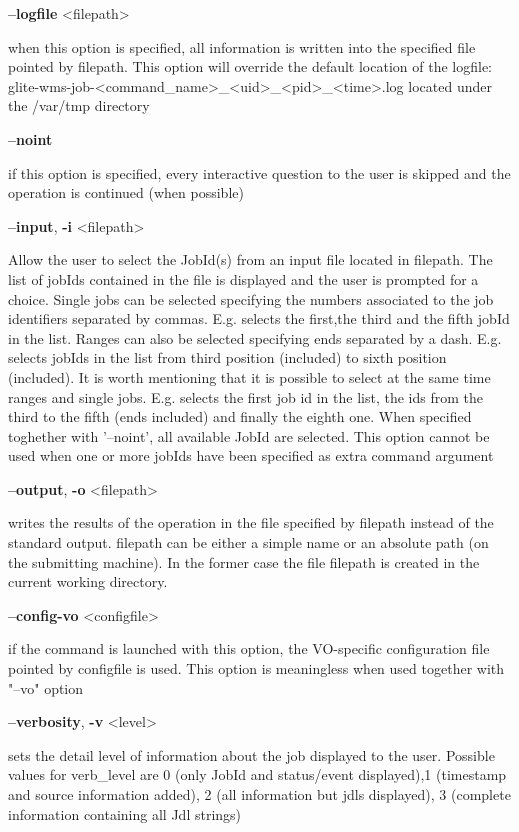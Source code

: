 {\textbf{--logfile} <filepath>

when this option is specified, all information is written into the specified file pointed by filepath.
This option will override the default location of the logfile:
glite-wms-job-<command\_name>\_<uid>\_<pid>\_<time>.log  located under the /var/tmp directory

\textbf{--noint}

if this option is specified, every interactive question to the user is skipped and the operation is continued (when possible)

\textbf{--input}, \textbf{-i} <filepath>

Allow the user to select the JobId(s) from an input file located in filepath.
The list of jobIds contained in the file is displayed and the user is prompted for a choice. Single jobs can be selected specifying the numbers associated to the job identifiers separated by commas. E.g. selects the first,the third and the fifth jobId in the list.
Ranges can also be selected specifying ends separated by a dash. E.g. selects jobIds in the list from third position (included) to sixth position (included). It is worth mentioning that it is possible to select at the same time ranges and single jobs. E.g. selects the first job id in the list, the ids from the third to the fifth (ends included) and finally the eighth one.
When specified toghether with '--noint', all available JobId are selected.
This option cannot be used when one or more jobIds have been specified as extra command argument

\textbf{--output}, \textbf{-o} <filepath>

writes the results of the operation in the file specified by filepath instead of the standard output. filepath can be either a simple name or an absolute path (on the submitting machine). In the former case the file filepath is created in the current working directory.

\textbf{--config-vo} <configfile>

if the command is launched with this option, the VO-specific configuration file pointed by configfile is used. This option is meaningless when used together with "--vo" option

\textbf{--verbosity}, \textbf{-v} <level>

sets the detail level of information about the job displayed to the user. Possible values for verb\_level are 0 (only JobId and status/event displayed),1 (timestamp and source information added), 2 (all information but jdls displayed), 3 (complete information containing all Jdl strings)

}
